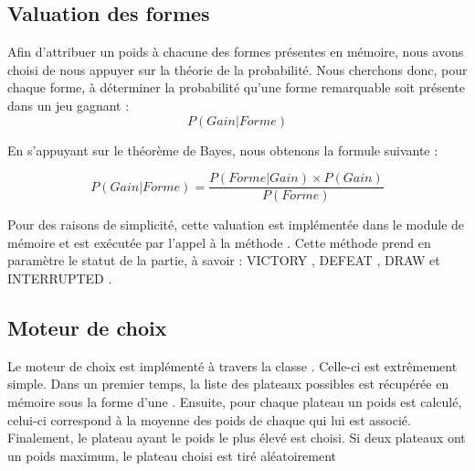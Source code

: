 \subsection{Valuation des formes}
  

Afin d'attribuer un poids à chacune des formes présentes en mémoire, nous avons choisi de nous appuyer sur la théorie de la probabilité. Nous cherchons donc, pour chaque forme, à déterminer la probabilité qu'une forme remarquable soit présente dans un jeu gagnant : \[ P(Gain|Forme) \]

En s'appuyant sur le théorème de Bayes, nous obtenons la formule suivante :

\[ P(Gain|Forme) = \frac{P(Forme|Gain) \times P(Gain)}{P(Forme)} \]

Pour des raisons de simplicité, cette valuation est implémentée dans le module de mémoire et est exécutée par l'appel à la méthode . Cette méthode prend en paramètre le statut de la partie, à savoir : \og VICTORY \fg{}, \og DEFEAT \fg{}, \og DRAW \fg{} et \og INTERRUPTED \fg{}.

\subsection{Moteur de choix}


Le moteur de choix est implémenté à travers la classe . Celle-ci est extrêmement simple. Dans un premier temps, la liste des plateaux possibles est récupérée en mémoire sous la forme d'une . Ensuite, pour chaque plateau un poids est calculé, celui-ci correspond à la moyenne des poids de chaque  qui lui est associé. Finalement, le plateau ayant le poids le plus élevé est choisi. Si deux plateaux ont un poids maximum, le plateau choisi est tiré aléatoirement%

